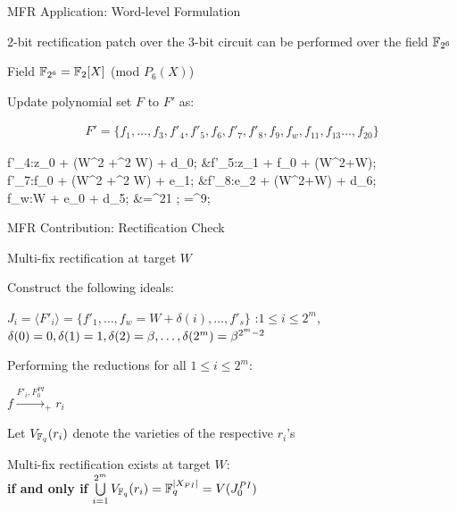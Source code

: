 \begin{frame}{\large MFR Application: Word-level Formulation }
\bi
	\item 2-bit rectification patch over the 3-bit circuit can be performed over the field ${\mathbb{F}}_{2^6}$
	\bi
		\item Field ${\mathbb{F}}_{2^6} = {\mathbb{F}}_2[X]$ (mod $P_6(X)$)
	\ei
	\vspace{0.1in}
	\item Update polynomial set $F$ to $F'$ as:
	\begin{center}
		\begin{align*}
			F'=\{f_1,\dots,f_3,f'_4,f'_5,f_6,f'_7,f'_8,f_9,f_w,f_{11},f_{13}\dots,f_{20}\}
		\end{align*}
		{\small\begin{flalign*}
			f'_4:z_0 + (\be W^2 +\be^2 W) + d_0;     &\quad f'_5:z_1 + f_0 + (W^2+W); \\
			f'_7:f_0 + (\be W^2 +\be^2 W) + e_1;   &\quad f'_8:e_2 + (W^2+W) + d_6; \\
			f_w:W + e_0 + \be d_5;             &\quad \be=\al^{21} ; \ga=\al^9;
		\end{flalign*}}
	\end{center}

\ei
\end{frame}

\begin{frame}{\large MFR Contribution: Rectification Check}
\bi
	\item Multi-fix rectification at target $W$
	\vspace{0.1in}
	\bi
		\item Construct the following ideals:
		\bi
			\item {\small $J_i = \langle F'_i\rangle =\{f'_1,\dots,f_w=W+\delta(i),\dots,f'_s\}$}
				:$1 \leq i \leq 2^m$, $\delta(0)=0, \delta(1)=1,\delta(2)=\beta,\dots,\delta(2^m)= \beta^{2^m-2}$
		\ei
		\vspace{0.1in}
		\item Performing the reductions for all $1 \leq i \leq 2^m$: 
		\bi
			\item $f\xrightarrow{F'_i, F_{0}^{PI}}_+r_i $
		\ei
		\item Let $V_{{\mathbb{F}}_{q}}(r_i)$ denote the varieties of the respective $r_i$'s
		\vspace{0.1in}
		\item Multi-fix rectification exists at target $W$: \\ 
				\centering
				{\bf if and only if} $\bigcup\limits_{i=1}^{2^m}V_{{\mathbb{F}}_{q}}(r_i) = {\mathbb{F}}_{q}^{|X_{PI}|} = V(J_0^{PI})$
	\ei
\ei
\end{frame}

